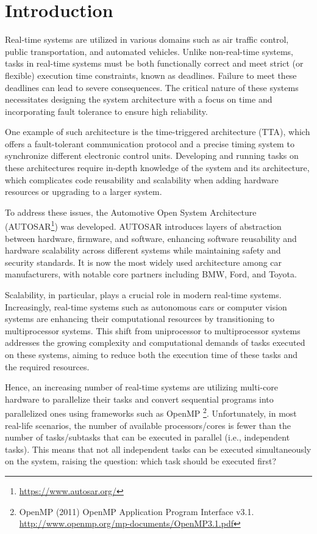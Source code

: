 \section{Introduction}
\label{sec:intro}

Real-time systems are utilized in various domains such as air traffic 
control, public transportation, and automated vehicles. Unlike non-real-time systems, 
tasks in real-time systems must be both functionally correct and meet strict 
(or flexible) execution time constraints, known as deadlines. Failure 
to meet these deadlines can lead to severe consequences. The critical 
nature of these systems necessitates designing the system 
architecture with a focus on time and incorporating fault tolerance 
to ensure high reliability.

One example of such architecture is the time-triggered 
architecture (TTA)\cite{kopetz2003tta}\cite{kopetz1998timetriggered}, which offers a fault-tolerant communication protocol and a precise timing system to synchronize different electronic control units. Developing and running tasks on these architectures require in-depth knowledge of the system and its architecture, which complicates code reusability and scalability when adding hardware resources or upgrading to a larger system.

To address these issues, the Automotive Open System Architecture 
(AUTOSAR\footnote{\url{https://www.autosar.org/}}) was developed. 
AUTOSAR introduces layers of abstraction between hardware, firmware, 
and software, enhancing software reusability and hardware 
scalability across different systems while maintaining safety and 
security standards. It is now the most widely used architecture among car 
manufacturers, with notable core partners including BMW, Ford, and Toyota.

Scalability, in particular, plays a crucial role in modern 
real-time systems. Increasingly, real-time systems such as 
autonomous cars or computer vision systems are enhancing their 
computational resources by transitioning to multiprocessor systems. 
This shift from uniprocessor to multiprocessor systems addresses 
the growing complexity and computational demands of tasks executed 
on these systems, aiming to reduce both the execution time of these 
tasks and the required resources\cite{maiza2019survey}.

Hence, an increasing number of real-time systems are 
utilizing multi-core hardware to parallelize their tasks 
and convert sequential programs into parallelized ones using 
frameworks such as OpenMP
\footnote{OpenMP (2011) OpenMP Application Program Interface v3.1. 
\url{http://www.openmp.org/mp-documents/OpenMP3.1.pdf}}. 
Unfortunately, in most real-life scenarios, the number of available 
processors/cores is fewer than the number of tasks/subtasks that 
can be executed in parallel (i.e., independent tasks). This means 
that not all independent tasks can be executed simultaneously on 
the system, raising the question: which task should be executed first?

